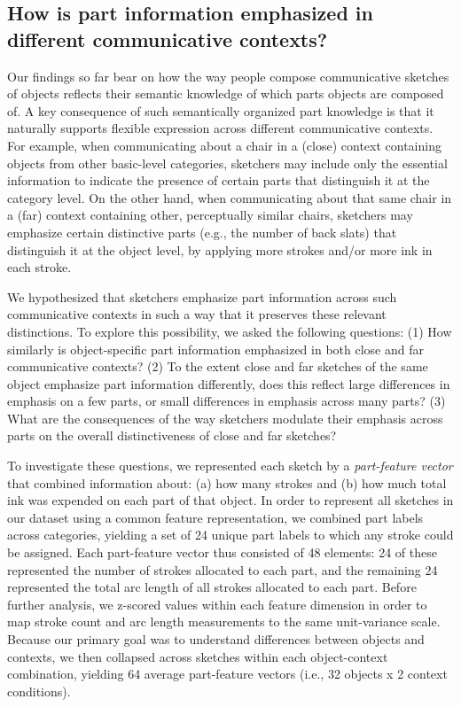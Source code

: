 \documentclass[10pt,letterpaper]{article}
\begin{document}
\subsection{How is part information emphasized in different communicative contexts?}

Our findings so far bear on how the way people compose communicative sketches of objects reflects their semantic knowledge of which parts objects are composed of. 
A key consequence of such semantically organized part knowledge is that it naturally supports flexible expression across different communicative contexts. 
For example, when communicating about a chair in a (close) context containing objects from other basic-level categories, sketchers may include only the essential information to indicate the presence of certain parts that distinguish it at the category level. 
On the other hand, when communicating about that same chair in a (far) context containing other, perceptually similar chairs, sketchers may emphasize certain distinctive parts (e.g., the number of back slats) that distinguish it at the object level, by applying more strokes and/or more ink in each stroke.

We hypothesized that sketchers emphasize part information across such communicative contexts in such a way that it preserves these relevant distinctions. 
To explore this possibility, we asked the following questions: 
(1) How similarly is object-specific part information emphasized in both close and far communicative contexts? 
(2) To the extent close and far sketches of the same object emphasize part information differently, does this reflect large differences in emphasis on a few parts, or small differences in emphasis across many parts? 
(3) What are the consequences of the way sketchers modulate their emphasis across parts on the overall distinctiveness of close and far sketches? 

To investigate these questions, we represented each sketch by a \textit{part-feature vector} that combined information about: (a) how many strokes and (b) how much total ink was expended on each part of that object. 
In order to represent all sketches in our dataset using a common feature representation, we combined part labels across categories, yielding a set of 24 unique part labels to which any stroke could be assigned. 
Each part-feature vector thus consisted of 48 elements: 24 of these represented the number of strokes allocated to each part, and the remaining 24 represented the total arc length of all strokes allocated to each part. 
Before further analysis, we z-scored values within each feature dimension in order to map stroke count and arc length measurements to the same unit-variance scale. 
Because our primary goal was to understand differences between objects and contexts, we then collapsed across sketches within each object-context combination, yielding 64 average part-feature vectors (i.e., 32 objects x 2 context conditions). 
\end{document}
